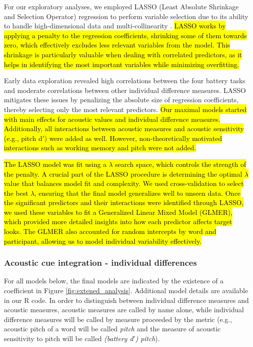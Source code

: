 For our exploratory analyses, we employed LASSO (Least Absolute Shrinkage and Selection Operator) regression to perform variable selection due to its ability to handle high-dimensional data and multi-collinearity \citep{Zhang2020, Tibshirani1996}. \hl{LASSO works by applying a penalty to the regression coefficients, shrinking some of them towards zero, which effectively excludes less relevant variables from the model. This shrinkage is particularly valuable when dealing with correlated predictors, as it helps in identifying the most important variables while minimizing overfitting.}

Early data exploration revealed high correlations between the four battery tasks and moderate correlations between other individual difference measures. LASSO mitigates these issues by penalizing the absolute size of regression coefficients, thereby selecting only the most relevant predictors. \hl{Our maximal models started with main effects for acoustic values and individual difference measures. Additionally, all interactions between acoustic measures and acoustic sensitivity (e.g., pitch d$'$) were added as well. However, non-theoretically motivated interactions such as working memory and pitch were not added.}

\hl{The LASSO model was fit using a $\lambda$ search space, which controls the strength of the penalty. A crucial part of the LASSO procedure is determining the optimal $\lambda$ value that balances model fit and complexity. We used cross-validation to select the best $\lambda$, ensuring that the final model generalizes well to unseen data. Once the significant predictors and their interactions were identified through LASSO, we used these variables to fit a Generalized Linear Mixed Model (GLMER), which provided more detailed insights into how each predictor affects target looks. The GLMER also accounted for random intercepts by word and participant, allowing us to model individual variability effectively.}

\subsubsection{Acoustic cue integration - individual differences}

For all models below, the final models are indicated by the existence of a coefficient in Figure \ref{fig:extened_analysis}. Additional model details are available in our R code. In order to distinguish between individual difference measures and acoustic measures, acoustic measures are called by name alone, while individual difference measures will be called by measure proceeded by the metric (e.g., acoustic pitch of a word will be called \textit{pitch} and the measure of acoustic sensitivity to pitch will be called \textit{(battery d$'$) pitch}). 

